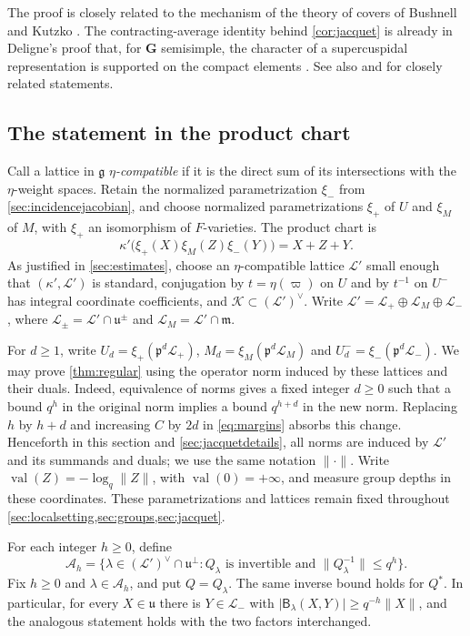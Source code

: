 \documentclass[11pt,reqno]{amsart}
\numberwithin{equation}{section}
\theoremstyle{plain}
\theoremstyle{definition}
\theoremstyle{remark}
\theoremstyle{plain}
\newcommand{\pp}{\mathfrak{p}}   %
\newcommand{\Lat}{\mathcal{L}}   %
\newcommand{\bG}{\mathbf{G}}     %
\newcommand{\g}{\mathfrak{g}}    %
\newcommand{\uu}{\mathfrak{u}}   %
\newcommand{\m}{\mathfrak{m}}    %
\newcommand{\abs}[1]{\lvert#1\rvert}
\newcommand{\norm}[1]{\lVert#1\rVert}
\newcommand{\etacompat}{$\eta$-compatible}
\DeclareMathOperator{\val}{val}
\newcommand{\lf}{\lambda}
\newcommand{\Bf}{\mathsf{B}}
\begin{document}
The proof is closely related to the mechanism of the theory of covers of Bushnell and Kutzko
\cite[\S\S6--8]{MR1643417}. The contracting-average identity behind \cref{cor:jacquet} is already in Deligne's
proof that, for $\bG$ semisimple, the character of a supercuspidal representation is supported on the compact elements \cite{MR0425033}.
See also \cite[Proposition~6.7]{MR1371680} and \cite[\S17.3]{MR2276772} for closely related statements.



\subsection{The statement in the product chart}\label{sec:localsetting}

Call a lattice in $\g$ \emph{\etacompat{}} if it is the direct sum
of its intersections with the $\eta$-weight spaces. Retain the normalized
parametrization $\xi_-$ from \cref{sec:incidencejacobian}, and choose
normalized parametrizations $\xi_+$ of $U$ and $\xi_M$ of $M$, with
$\xi_+$ an isomorphism of $F$-varieties. The product chart is
\begin{equation}\label{eq:productchart}
\kappa'\bigl(\xi_+(X)\xi_M(Z)\xi_-(Y)\bigr)=X+Z+Y.
\end{equation}
As justified in \cref{sec:estimates}, choose an \etacompat{} lattice
$\Lat'$ small enough that $(\kappa',\Lat')$ is standard, conjugation
by $t=\eta(\varpi)$ on $U$ and by $t^{-1}$ on $U^-$ has integral
coordinate coefficients, and $\mathcal K\subset(\Lat')^\vee$.
Write $\Lat'=\Lat_+\oplus\Lat_M\oplus\Lat_-$, where
$\Lat_\pm=\Lat'\cap\uu^\pm$ and $\Lat_M=\Lat'\cap\m$.

For $d\ge1$, write $U_d=\xi_+(\pp^d\Lat_+)$, $M_d=\xi_M(\pp^d\Lat_M)$ and
$U^-_d=\xi_-(\pp^d\Lat_-)$. We may prove \cref{thm:regular} using
the operator norm induced by these lattices and their duals.
Indeed, equivalence of norms gives a fixed integer $d\ge0$ such that
a bound $q^h$ in the original norm implies a bound $q^{h+d}$ in the
new norm. Replacing $h$ by $h+d$ and increasing $C$ by $2d$ in
\eqref{eq:margins} absorbs this change.
Henceforth in this section and \cref{sec:jacquetdetails}, all norms
are induced by $\Lat'$ and its summands and duals; we use the same
notation $\norm{\cdot}$. Write $\val(Z)=-\log_q\norm{Z}$, with
$\val(0)=+\infty$, and measure group depths in these coordinates.
These parametrizations and lattices remain fixed throughout
\cref{sec:localsetting,sec:groups,sec:jacquet}.

For each integer $h\ge0$, define
\begin{equation}\label{eq:Qbound}
\mathcal A_h=\{\lf\in(\Lat')^\vee\cap\uu^\perp:
Q_\lf\text{ is invertible and }\norm{Q_\lf^{-1}}\le q^h\}.
\end{equation}
Fix $h\ge0$ and $\lf\in\mathcal A_h$, and put $Q=Q_\lf$.
The same inverse bound holds for $Q^*$. In particular, for every
$X\in\uu$ there is $Y\in\Lat_-$ with
$\abs{\Bf_\lf(X,Y)}\ge q^{-h}\norm{X}$, and the analogous statement
holds with the two factors interchanged.
\end{document}
